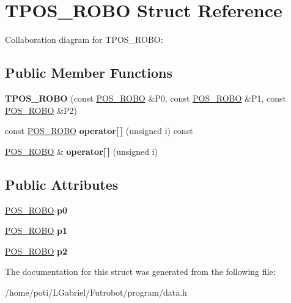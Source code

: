 \hypertarget{structTPOS__ROBO}{}\section{T\+P\+O\+S\+\_\+\+R\+O\+BO Struct Reference}
\label{structTPOS__ROBO}


Collaboration diagram for T\+P\+O\+S\+\_\+\+R\+O\+BO\+:
\subsection*{Public Member Functions}
\begin{DoxyCompactItemize}
\item 
{\bfseries T\+P\+O\+S\+\_\+\+R\+O\+BO} (const \hyperlink{structPOS__ROBO}{P\+O\+S\+\_\+\+R\+O\+BO} \&P0, const \hyperlink{structPOS__ROBO}{P\+O\+S\+\_\+\+R\+O\+BO} \&P1, const \hyperlink{structPOS__ROBO}{P\+O\+S\+\_\+\+R\+O\+BO} \&P2)\hypertarget{structTPOS__ROBO_af9d94901d770ea84aaa48fc47f8118f0}{}\label{structTPOS__ROBO_af9d94901d770ea84aaa48fc47f8118f0}

\item 
const \hyperlink{structPOS__ROBO}{P\+O\+S\+\_\+\+R\+O\+BO} {\bfseries operator\mbox{[}$\,$\mbox{]}} (unsigned i) const \hypertarget{structTPOS__ROBO_a8c13d4204b071634da1f99c295385b85}{}\label{structTPOS__ROBO_a8c13d4204b071634da1f99c295385b85}

\item 
\hyperlink{structPOS__ROBO}{P\+O\+S\+\_\+\+R\+O\+BO} \& {\bfseries operator\mbox{[}$\,$\mbox{]}} (unsigned i)\hypertarget{structTPOS__ROBO_afbe526cc6b662f95eae78fd99ee305cf}{}\label{structTPOS__ROBO_afbe526cc6b662f95eae78fd99ee305cf}

\end{DoxyCompactItemize}
\subsection*{Public Attributes}
\begin{DoxyCompactItemize}
\item 
\hyperlink{structPOS__ROBO}{P\+O\+S\+\_\+\+R\+O\+BO} {\bfseries p0}\hypertarget{structTPOS__ROBO_affb851e9868f699eeeaacb5377beb5bf}{}\label{structTPOS__ROBO_affb851e9868f699eeeaacb5377beb5bf}

\item 
\hyperlink{structPOS__ROBO}{P\+O\+S\+\_\+\+R\+O\+BO} {\bfseries p1}\hypertarget{structTPOS__ROBO_a42d777f19cac0bd596d872e7f6680673}{}\label{structTPOS__ROBO_a42d777f19cac0bd596d872e7f6680673}

\item 
\hyperlink{structPOS__ROBO}{P\+O\+S\+\_\+\+R\+O\+BO} {\bfseries p2}\hypertarget{structTPOS__ROBO_a0f63fc873824110d39fe0d92e1124166}{}\label{structTPOS__ROBO_a0f63fc873824110d39fe0d92e1124166}

\end{DoxyCompactItemize}


The documentation for this struct was generated from the following file\+:\begin{DoxyCompactItemize}
\item 
/home/poti/\+L\+Gabriel/\+Futrobot/program/data.\+h\end{DoxyCompactItemize}
